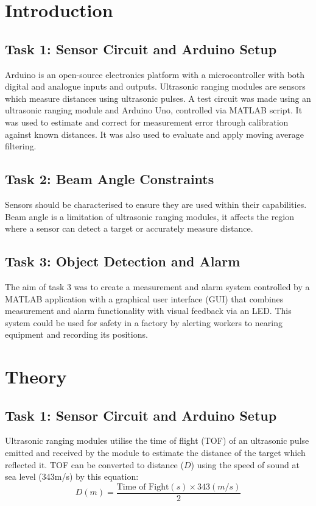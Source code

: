 \documentclass[a4paper,12pt]{article}
\begin{document}
\section{Introduction}

\subsection{Task 1: Sensor Circuit and Arduino Setup}

Arduino is an open-source electronics platform with a microcontroller with both digital and analogue inputs and outputs. Ultrasonic ranging modules are sensors which measure distances using ultrasonic pulses.
A test circuit was made using an ultrasonic ranging module and Arduino Uno, controlled via MATLAB script.
It was used to estimate and correct for measurement error through calibration against known distances. It was also used to evaluate and apply moving average filtering. 

\subsection{Task 2: Beam Angle Constraints}
Sensors should be characterised to ensure they are used within their capabilities. Beam angle is a limitation of ultrasonic ranging modules, it affects the region where a sensor can detect a target or accurately measure distance.


\subsection{Task 3: Object Detection and Alarm}

The aim of task 3 was to create a measurement and alarm system controlled by a MATLAB application with a graphical user interface (GUI) that combines measurement and alarm functionality with visual feedback via an LED. This system could be used for safety in a factory by alerting workers to nearing equipment and recording its positions.



\section{Theory}

\subsection{Task 1: Sensor Circuit and Arduino Setup}
Ultrasonic ranging modules utilise the time of flight (TOF) of an ultrasonic pulse emitted and received by the module to estimate the distance of the target which reflected it. TOF can be converted to distance ($D$) using the speed of sound at sea level (343m/s) by this equation:
\begin{equation}
D(m) = \frac{\text{Time of Fight} (s)\times343(m/s)}{2}
\end{equation}
\end{document}
